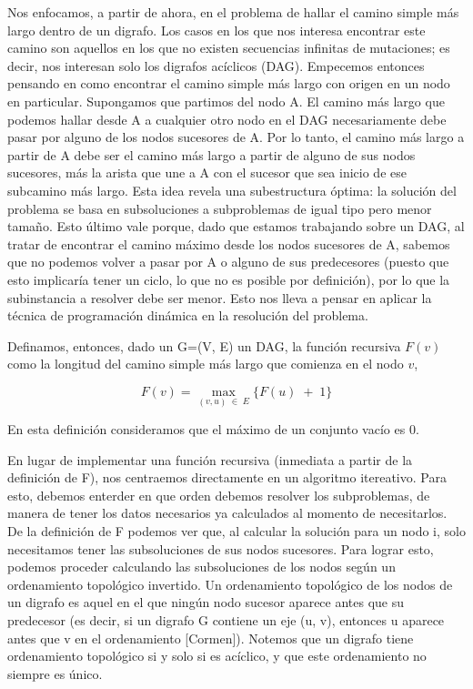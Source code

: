 Nos enfocamos, a partir de ahora, en el problema de hallar el camino simple m\'as largo dentro de un digrafo. 
Los casos en los que nos interesa encontrar este camino son aquellos en los que no existen secuencias infinitas de mutaciones; es decir, nos interesan solo los digrafos ac\'iclicos (DAG).
Empecemos entonces pensando en como encontrar el camino simple m\'as largo con origen en un nodo en particular. 
Supongamos que partimos del nodo A. 
El camino m\'as largo que podemos hallar desde A a cualquier otro nodo en el DAG necesariamente
debe pasar por alguno de los nodos sucesores de A.
Por lo tanto, el camino m\'as largo a partir de A debe ser el camino m\'as largo a partir de alguno de sus nodos sucesores, m\'as la arista que une a A con el sucesor que sea inicio de ese subcamino m\'as largo.
Esta idea revela una subestructura \'optima: la soluci\'on del problema se basa en subsoluciones a subproblemas de igual tipo pero menor tamaño. Esto \'ultimo vale porque, dado que estamos trabajando sobre un DAG, al tratar de encontrar el camino m\'aximo desde los nodos sucesores de A, sabemos que no podemos volver a pasar por A o alguno de sus predecesores (puesto que esto implicar\'ia tener un ciclo, lo que no es posible por definici\'on), por lo que la subinstancia a resolver debe ser menor.
Esto nos lleva a pensar en aplicar la t\'ecnica de programaci\'on din\'amica en la resoluci\'on del problema.

Definamos, entonces, dado un G=(V, E) un DAG, la funci\'on recursiva $F(v)$ como la longitud del camino simple más largo que comienza en el nodo $v$, 

$$F(v)= \max_{(v, u)\;\in\;E} \{F(u)\; + \; 1\}$$

En esta definici\'on consideramos que el m\'aximo de un conjunto vac\'io es 0.

En lugar de implementar una funci\'on recursiva (inmediata a partir de la definici\'on de F), nos centraemos directamente en un
algoritmo itereativo. Para esto, debemos enterder en que orden debemos resolver los subproblemas, de manera de tener los datos necesarios ya calculados al momento de necesitarlos. De la definici\'on de F podemos ver que, al calcular la soluci\'on para un nodo i, solo necesitamos tener las subsoluciones de sus nodos sucesores. 
Para lograr esto, podemos proceder calculando las subsoluciones de los nodos seg\'un un ordenamiento topol\'ogico invertido.
Un ordenamiento topol\'ogico de los nodos de un digrafo es aquel en el que ning\'un nodo sucesor aparece antes que su predecesor (es decir, si un digrafo G contiene un eje (u, v), entonces u aparece antes que v en el ordenamiento [Cormen]). Notemos que un digrafo tiene ordenamiento topol\'ogico si y solo si es ac\'iclico, y que este ordenamiento no siempre es único. 

